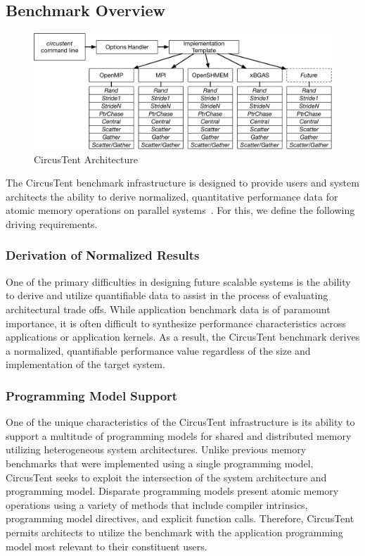 
\subsection{Benchmark Overview}
\label{subsec:benchmark_overview}

\begin{figure}[!t]
\centering
\includegraphics[width=5in]{figures/arch.pdf}
\caption{CircusTent Architecture}
\label{fig:ct_arch}
\end{figure}

The CircusTent benchmark infrastructure is designed to provide users and system architects the ability to derive normalized, quantitative performance data for atomic memory operations on parallel systems~\cite{ctrepo}.
For this, we define the following driving requirements.  

\subsubsection*{Derivation of Normalized Results}

One of the primary difficulties in designing future scalable systems is the ability to derive and utilize quantifiable data to assist in the process of evaluating architectural trade offs.
While application benchmark data is of paramount importance, it is often difficult to synthesize performance characteristics across applications or application kernels.
As a result, the CircusTent benchmark derives a normalized, quantifiable performance value regardless of the size and implementation of the target system.  

\subsubsection*{Programming Model Support}

One of the unique characteristics of the CircusTent infrastructure is its ability to support a multitude of programming models for shared and distributed memory utilizing heterogeneous system architectures.
Unlike previous memory benchmarks that were implemented using a single programming model, CircusTent seeks to exploit the intersection of the system architecture and programming model.
Disparate programming models present atomic memory operations using a variety of methods that include compiler intrinsics, programming model directives, and explicit function calls.
Therefore, CircusTent permits architects to utilize the benchmark with the application programming model most relevant to their constituent users. 

